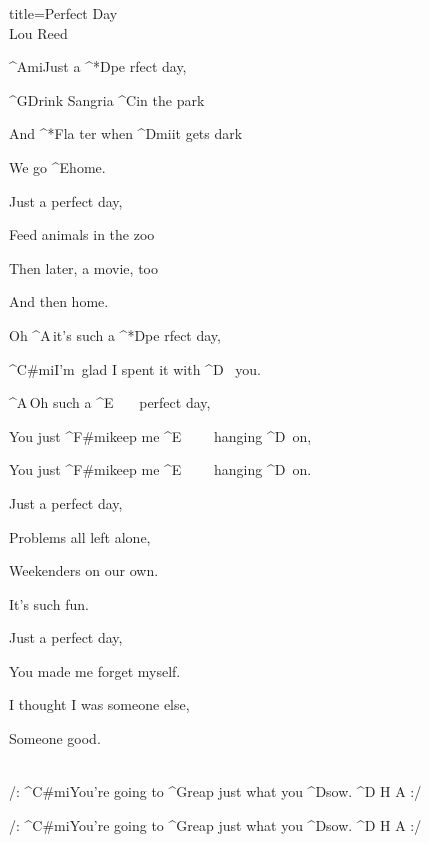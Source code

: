 \begin{song}{title=\predtitle\centering Perfect Day \\\large Lou Reed \vspace*{-0.3cm}}  %
\begin{centerjustified}

\sloka
	^{Ami}Just a ^*{D}pe rfect day,

	^{G\z }Drink Sangria ^{C}in the park

	And ^*{F}la ter when ^{Dmi}it gets dark

	We go ^{E\z }home.

\sloka
	Just a perfect day,

	Feed animals in the zoo

	Then later, a movie, too

	And then home.


	Oh ^{A\,}it's such a ^*{D}pe rfect day,

	^{C#mi\z}I'm~glad I spent it with ^{D\,\,\,\,\,}you.

	^{A\,}Oh such a ^{E\,\,\,\,\,\,\,\,\,\,\,}perfect day,

	You just ^{F#mi}keep me ^{E\,\,\,\,\,\,\,\,\,\,\,\,\,\,}hanging ^{D\,\,\,}on,

	You just ^{F#mi}keep me ^{E\,\,\,\,\,\,\,\,\,\,\,\,\,\,}hanging ^{D\,\,\,}on.

\sloka
	Just a perfect day,

	Problems all left alone,

	Weekenders on our own.

	It's such fun.

\sloka
	Just a perfect day,

	You made me forget myself.
	
	I thought I was someone else,
	
	Someone good.


\\
 
	/: ^{C#mi}You're going to ^{G\z }reap just what you ^{D\z }sow.  ^{D\,\,H\,\,A} :/
 
 	/: ^{C#mi}You're going to ^{G\z }reap just what you ^{D\z }sow.  ^{D\,\,H\,\,A} :/\\
 	
 	

\end{centerjustified}
\setcounter{Slokočet}{0}
\end{song}
